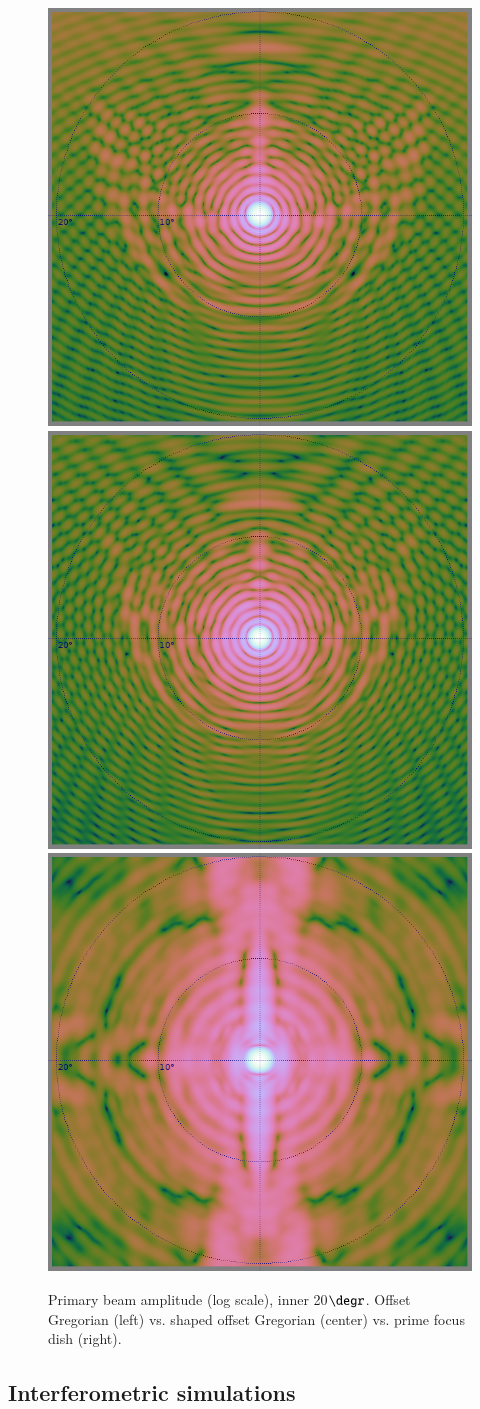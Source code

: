 \documentclass{aa}
\begin{document}
\begin{figure}
  \includegraphics[width=.33\textwidth]{beam-og-20}\hfill%
  \includegraphics[width=.33\textwidth]{beam-ogs-20}\hfill%
  \includegraphics[width=.33\textwidth]{beam-pf-20}
  \caption{\label{fig:pb20}Primary beam amplitude (log scale), inner 20$\degr$. Offset Gregorian (left) vs. shaped offset Gregorian (center) vs. prime focus dish (right).}
 
\end{figure}


\subsection{Interferometric simulations}
\end{document}
